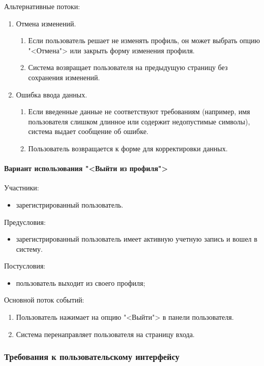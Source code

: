 Альтернативные потоки:
\begin{enumerate}
	\item Отмена изменений.
	\begin{enumerate}
		\item Если пользователь решает не изменять профиль, он может выбрать опцию "<Отмена"> или закрыть форму изменения профиля.
		\item Система возвращает пользователя на предыдущую страницу без сохранения изменений.
	\end{enumerate}
	\item Ошибка ввода данных.
	\begin{enumerate}
		\item Если введенные данные не соответствуют требованиям (например, имя пользователя слишком длинное или содержит недопустимые символы), система выдает сообщение об ошибке.
		\item Пользователь возвращается к форме для корректировки данных.
	\end{enumerate}
\end{enumerate}

\paragraph{Вариант использования "<Выйти из профиля">}

Участники:
\begin{itemize}
	\item зарегистрированный пользователь.
\end{itemize}

Предусловия:
\begin{itemize}
	\item зарегистрированный пользователь имеет активную учетную запись и вошел в систему.
\end{itemize}

Постусловия:
\begin{itemize}
	\item пользователь выходит из своего профиля;
\end{itemize}

Основной поток событий:
\begin{enumerate}
	\item Пользователь нажимает на опцию "<Выйти"> в панели пользователя.
	\item Система перенаправляет пользователя на страницу входа.
\end{enumerate}


\subsubsection{Требования к пользовательскому интерфейсу}

